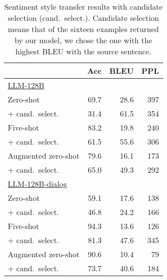 
\begin{table}
\caption{
Sentiment style transfer results with candidate selection (cand.~select.). 
Candidate selection means that of the sixteen examples returned by our model, we chose the one with the highest BLEU with the source sentence.  
}
\label{tab:candidate_select}
    \centering \small 
        \begin{tabular}{l r r r}
        \toprule
         & Acc & BLEU & PPL\\
        \midrule
        \underline{LLM-128B} \\
        Zero-shot & 69.7 & 28.6 & 397 \\
        + cand.~select. & 31.4 & 61.5 & 354\\
        Five-shot & 83.2 & 19.8 & 240\\
        + cand.~select. & 61.5 & 55.6 & 306\\
        Augmented zero-shot & 79.6 & 16.1 & 173\\
        + cand.~select. & 65.0 & 49.3 & 292\\
        \midrule
        \underline{LLM-128B-dialog} \\
        Zero-shot & 59.1 & 17.6 & 138\\
        + cand.~select. & 46.8 & 24.2 & 166\\
        Five-shot & 94.3 & 13.6 & 126\\
        + cand.~select. & 81.3 & 47.6 & 345\\
        Augmented zero-shot & 90.6 & 10.4 & 79\\
        + cand.~select. & 73.7 & 40.6 & 184\\
        \bottomrule
        \end{tabular}
\end{table}
